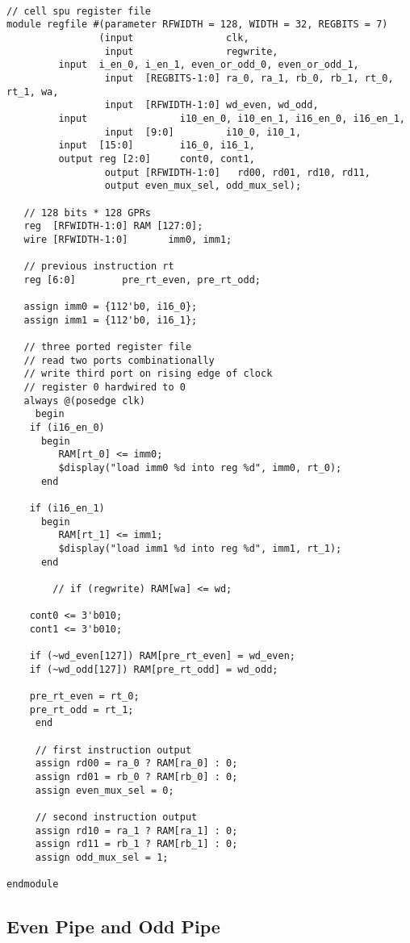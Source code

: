 \documentclass[preprint,authoryear,12pt]{elsarticle}
\begin{document}
\begin{verbatim}

// cell spu register file
module regfile #(parameter RFWIDTH = 128, WIDTH = 32, REGBITS = 7)
                (input                clk, 
                 input                regwrite,
		 input  i_en_0, i_en_1, even_or_odd_0, even_or_odd_1,
                 input  [REGBITS-1:0] ra_0, ra_1, rb_0, rb_1, rt_0, rt_1, wa,
                 input  [RFWIDTH-1:0] wd_even, wd_odd,
		 input                i10_en_0, i10_en_1, i16_en_0, i16_en_1,
                 input  [9:0]         i10_0, i10_1,
		 input  [15:0]        i16_0, i16_1,
		 output reg [2:0]     cont0, cont1,
                 output [RFWIDTH-1:0]   rd00, rd01, rd10, rd11,
                 output even_mux_sel, odd_mux_sel);

   // 128 bits * 128 GPRs
   reg  [RFWIDTH-1:0] RAM [127:0];
   wire	[RFWIDTH-1:0]	    imm0, imm1;

   // previous instruction rt
   reg [6:0] 	    pre_rt_even, pre_rt_odd;
   
   assign imm0 = {112'b0, i16_0};
   assign imm1 = {112'b0, i16_1};

   // three ported register file
   // read two ports combinationally
   // write third port on rising edge of clock
   // register 0 hardwired to 0
   always @(posedge clk)
     begin
	if (i16_en_0)
	  begin
	     RAM[rt_0] <= imm0;
	     $display("load imm0 %d into reg %d", imm0, rt_0);
	  end

	if (i16_en_1)
	  begin
	     RAM[rt_1] <= imm1;
	     $display("load imm1 %d into reg %d", imm1, rt_1);
	  end
	
        // if (regwrite) RAM[wa] <= wd;

	cont0 <= 3'b010;
	cont1 <= 3'b010;

	if (~wd_even[127]) RAM[pre_rt_even] = wd_even;
	if (~wd_odd[127]) RAM[pre_rt_odd] = wd_odd;

	pre_rt_even = rt_0;
	pre_rt_odd = rt_1;
     end

     // first instruction output
     assign rd00 = ra_0 ? RAM[ra_0] : 0;
     assign rd01 = rb_0 ? RAM[rb_0] : 0;
     assign even_mux_sel = 0;
   
     // second instruction output
     assign rd10 = ra_1 ? RAM[ra_1] : 0;
     assign rd11 = rb_1 ? RAM[rb_1] : 0;
     assign odd_mux_sel = 1;

endmodule

\end{verbatim}

\subsection{Even Pipe and Odd Pipe}
\end{document}

